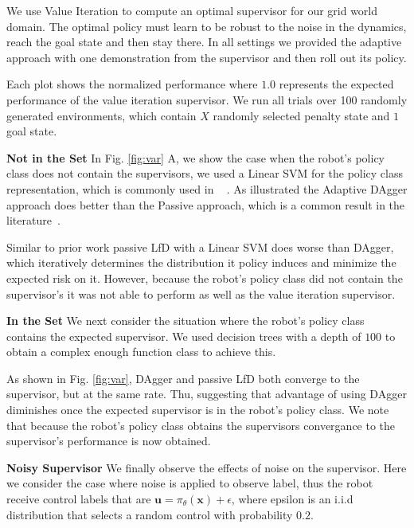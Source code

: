 \documentclass[10pt, conference]{ieeeconf}      %
\newcommand{\bu}{\mathbf{u}}
\newcommand{\bx}{\mathbf{x}}
\begin{document}
We use Value Iteration to compute an optimal supervisor for our grid world domain. The optimal policy must learn to be robust to the noise in the dynamics, reach the goal state and then stay there. In all settings we provided the adaptive approach with one demonstration from the supervisor and then roll out its policy. 

Each plot shows the normalized performance where $1.0$ represents the expected performance of the value iteration supervisor. We run all trials over 100 randomly generated environments, which contain $X$ randomly selected penalty state and $1$ goal state. 


\noindent \textbf{Not in the Set} In Fig. \ref{fig:var} A, we show the case when the robot's policy class does not contain the supervisors, we used a Linear SVM for the policy class representation, which is commonly used in ~\cite{ross2010efficient,ross2010reduction,ross2013learning} . As illustrated the Adaptive DAgger approach does better than the Passive approach, which is a common result in the literature~\cite{ross2010efficient,ross2010reduction}.


Similar to prior work passive LfD  with a Linear SVM does worse than DAgger, which iteratively determines the distribution it policy induces and minimize the expected risk on it. However, because the robot's policy class did not contain the supervisor's it was not able to perform as well as the value iteration supervisor. 

\noindent \textbf{In the Set}
We next consider the situation where the robot's policy class contains the expected supervisor. We used decision trees with a depth of $100$ to obtain a complex enough function class to achieve this. 

As shown in Fig. \ref{fig:var}, DAgger and passive LfD both converge to the supervisor, but at the same rate. Thu, suggesting that advantage of using DAgger diminishes once the expected supervisor is in the robot's policy class. We note that because the robot's policy class obtains the supervisors convergance to the supervisor's performance is now obtained. 




\noindent \textbf{Noisy Supervisor}
We finally observe the effects of noise on the supervisor. Here we consider the case where noise is applied to observe label, thus the robot receive control labels that are $\bu = \pi_{\theta}(\bx) + \epsilon$,  where epsilon is an i.i.d distribution that selects a random control with probability $0.2$.
\end{document}
